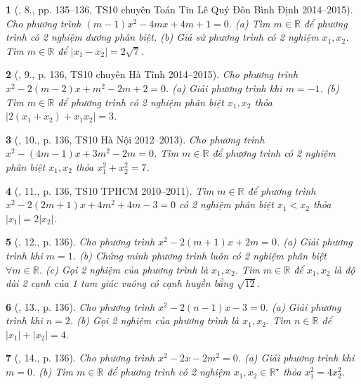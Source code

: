 \documentclass{article}
\newtheorem{baitoan}{}
\begin{document}
\begin{baitoan}[\cite{Thu_Viet_Minh_ptb2}, 8., pp. 135--136, TS10 chuyên Toán Tin Lê Quý Đôn Bình Định 2014--2015]
	Cho phương trình $(m - 1)x^2 - 4mx + 4m + 1 = 0$. (a) Tìm $m\in\mathbb{R}$ để phương trình có 2 nghiệm dương phân biệt. (b) Giả sử phương trình có 2 nghiệm $x_1,x_2$. Tìm $m\in\mathbb{R}$ để $|x_1 - x_2| = 2\sqrt{7}$.
\end{baitoan}

\begin{baitoan}[\cite{Thu_Viet_Minh_ptb2}, 9., p. 136, TS10 chuyên Hà Tĩnh 2014--2015]
	Cho phương trình $x^2 - 2(m - 2)x + m^2 - 2m + 2 = 0$. (a) Giải phương trình khi $m = -1$. (b) Tìm $m\in\mathbb{R}$ để phương trình có 2 nghiệm phân biệt $x_1,x_2$ thỏa $|2(x_1 + x_2) + x_1x_2| = 3$.
\end{baitoan}

\begin{baitoan}[\cite{Thu_Viet_Minh_ptb2}, 10., p. 136, TS10 Hà Nội 2012--2013]
	Cho phương trình $x^2 - (4m - 1)x + 3m^2 - 2m = 0$. Tìm $m\in\mathbb{R}$ để phương trình có 2 nghiệm phân biệt $x_1,x_2$ thỏa $x_1^2 + x_2^2 = 7$.
\end{baitoan}

\begin{baitoan}[\cite{Thu_Viet_Minh_ptb2}, 11., p. 136, TS10 TPHCM 2010--2011]
	Tìm $m\in\mathbb{R}$ để phương trình $x^2 - 2(2m + 1)x + 4m^2 + 4m - 3 = 0$ có 2 nghiệm phân biệt $x_1 < x_2$ thỏa $|x_1| = 2|x_2|$.
\end{baitoan}

\begin{baitoan}[\cite{Thu_Viet_Minh_ptb2}, 12., p. 136]
	Cho phương trình $x^2 - 2(m + 1)x + 2m = 0$. (a) Giải phương trình khi $m = 1$. (b) Chứng minh phương trình luôn có 2 nghiệm phân biệt $\forall m\in\mathbb{R}$. (c) Gọi 2 nghiệm của phương trình là $x_1,x_2$. Tìm $m\in\mathbb{R}$ để $x_1,x_2$ là độ dài 2 cạnh của 1 tam giác vuông có cạnh huyền bằng $\sqrt{12}$.
\end{baitoan}

\begin{baitoan}[\cite{Thu_Viet_Minh_ptb2}, 13., p. 136]
	Cho phương trình $x^2 - 2(n - 1)x - 3 = 0$. (a) Giải phương trình khi $n = 2$. (b) Gọi 2 nghiệm của phương trình là $x_1,x_2$. Tìm $n\in\mathbb{R}$ để $|x_1| + |x_2| = 4$.
\end{baitoan}

\begin{baitoan}[\cite{Thu_Viet_Minh_ptb2}, 14., p. 136]
	Cho phương trình $x^2 - 2x - 2m^2 = 0$. (a) Giải phương trình khi $m = 0$. (b) Tìm $m\in\mathbb{R}$ để phương trình có 2 nghiệm $x_1,x_2\in\mathbb{R}^\star$ thỏa $x_1^2 = 4x_2^2$.
\end{baitoan}
\end{document}
